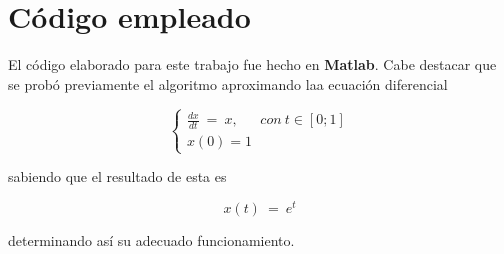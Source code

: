 \documentclass[a4paper]{article}
\begin{document}
\section{Código empleado}
El código elaborado para este trabajo fue hecho en \textbf{Matlab}.
Cabe destacar que se probó previamente el algoritmo aproximando laa ecuación diferencial

\[\left\{
  \begin{array}{lr}
    \frac{dx}{dt} \ = \ x, \ \ \ \ \ \ \ con \ t \in [0;1]\\
    x(0) = 1
  \end{array}
\right.
\]

sabiendo que el resultado de esta es

\[ x(t) \ = \ e^t \]

determinando así su adecuado funcionamiento.
	
\end{document}
